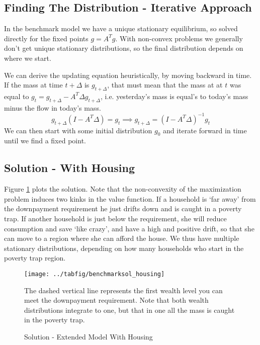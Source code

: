 \documentclass[12pt]{article}
\DeclareMathOperator{\1}{\mathbbm{1}}
\begin{document}
\subsection{Finding The Distribution - Iterative Approach}
In the benchmark model we have a unique stationary equilibrium, so solved directly for the fixed points $g=A^Tg$. With non-convex problems we generally don't get unique stationary distributions, so the final distribution depends on where we start.

We can derive the updating equation heuristically, by moving backward in time. If the mass at time $t+\Delta$ is $g_{t+\Delta}$, that must mean that the mass at at $t$ was equal to $g_t=g_{t+\Delta} - A^T\Delta g_{t+\Delta}$, i.e. yesterday's mass is equal's to today's mass minus the flow in today's mass.
\begin{equation}
g_{t+\Delta}(I - A^T\Delta)=g_t \implies g_{t+\Delta}  = (I - A^T\Delta)^{-1}g_t
\end{equation}
We can then start with some initial distribution $g_0$ and iterate forward in time until we find a fixed point. 
\subsection{Solution - With Housing}
Figure \ref{fig:solHousing} plots the solution. Note that the non-convexity of the maximization problem induces two kinks in the value function. If a household is `far away' from the downpayment requirement he just drifts down and is caught in a poverty trap. If another household is just below the requirement, she will reduce consumption and save `like crazy', and have a high and positive drift, so that she can move to a region where she can afford the house. We thus have multiple stationary distributions, depending on how many households who start in the poverty trap region.
\begin{figure}

\begin{center}
\caption{Solution - Extended Model With Housing}
\label{fig:solHousing}
\texttt{[image: ../tabfig/benchmarksol\_housing]}
\end{center}
{\small 

The dashed vertical line represents the first wealth level you can meet the downpayment requirement. Note that both wealth distributions integrate to one, but that in one all the mass is caught in the poverty trap. }
\end{figure}
\end{document}
